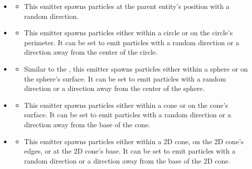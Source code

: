 \begin{itemize}[nolistsep,topsep=10pt]

	\item {}
	\begin{itemize}[nolistsep,topsep=0pt]
		\item This emitter spawns particles at the parent entity's position with a random direction.
	\end{itemize}

	\item {}
	\begin{itemize}[nolistsep,topsep=0pt]
		\item This emitter spawns particles either within a circle or on the circle's perimeter. It can be set to emit particles with a random direction or a direction away from the center of the circle.
	\end{itemize}

	\item {}
	\begin{itemize}[nolistsep,topsep=0pt]
		\item Similar to the , this emitter spawns particles either within a sphere or on the sphere's surface. It can be set to emit particles with a random direction or a direction away from the center of the sphere.
	\end{itemize}

	\item {}
	\begin{itemize}[nolistsep,topsep=0pt]
		\item This emitter spawns particles either within a cone or on the cone's surface. It can be set to emit particles with a random direction or a direction away from the base of the cone.
	\end{itemize}

	\item {}
	\begin{itemize}[nolistsep,topsep=0pt]
		\item This emitter spawns particles either within a 2D cone, on the 2D cone's edges, or at the 2D cone's base. It can be set to emit particles with a random direction or a direction away from the base of the 2D cone.
	\end{itemize}

\end{itemize}

